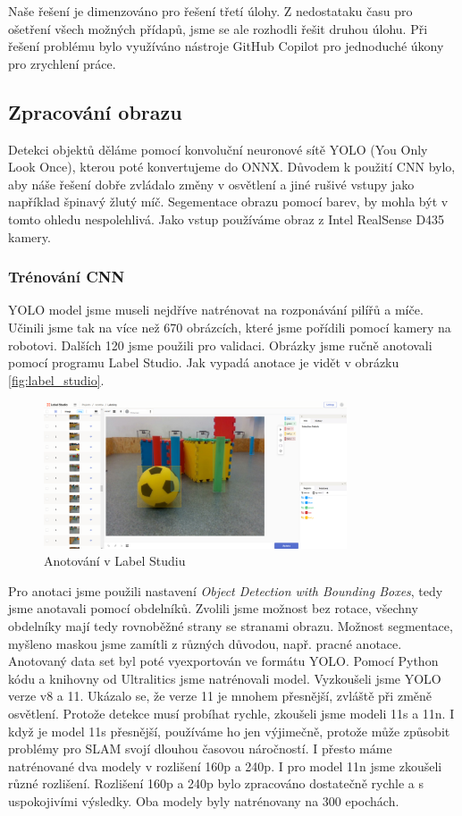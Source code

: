 \documentclass[a4paper,12pt]{article}
\begin{document}
Naše řešení je dimenzováno pro řešení třetí úlohy. Z nedostataku času pro ošetření všech možných přídapů, jsme se ale rozhodli řešit druhou úlohu. 
Při řešení problému bylo využíváno nástroje GitHub Copilot pro jednoduché úkony pro zrychlení práce. 
\subsection{Zpracování obrazu}
Detekci objektů děláme pomocí konvoluční neuronové sítě YOLO (You Only Look Once), kterou poté konvertujeme do ONNX. Důvodem k použití CNN bylo, aby náše řešení dobře zvládalo změny v osvětlení a jiné rušivé vstupy jako například špinavý žlutý míč. Segementace obrazu pomocí barev, by mohla být v tomto ohledu nespolehlivá. Jako vstup používáme obraz z Intel RealSense D435 kamery.
\subsubsection{Trénování CNN}
YOLO model jsme museli nejdříve natrénovat na rozponávání pilířů a míče. Učinili jsme tak na více než 670 obrázcích,
které jsme pořídili pomocí kamery na robotovi. Dalších 120 jsme použili pro validaci. Obrázky jsme ručně anotovali pomocí programu Label Studio. Jak vypadá anotace je vidět v obrázku \eqref{fig:label_studio}.
\begin{figure}[H]
    \centering
    \includegraphics[width=0.8\textwidth]{pictures/label_studio.png}
    \caption{Anotování v Label Studiu}
    \label{fig:label_studio}	
\end{figure}
Pro anotaci jsme použili nastavení \textit{Object Detection with Bounding Boxes}, tedy jsme anotavali pomocí obdelníků. Zvolili jsme možnost bez rotace, všechny obdelníky mají tedy rovnoběžné strany se stranami obrazu. 
Možnost segmentace, myšleno maskou jsme zamítli z různých důvodou, např. pracné anotace. 
Anotovaný data set byl poté vyexportován ve formátu YOLO.
Pomocí Python kódu a knihovny od Ultralitics jsme natrénovali model. Vyzkoušeli jsme YOLO verze v8 a 11. Ukázalo se, že verze 11 je mnohem přesnější, zvláště při změně osvětlení. 
Protože detekce musí probíhat rychle, zkoušeli jsme modeli 11s a 11n. I když je model 11s přesnější, používáme ho jen výjimečně, protože může způsobit problémy pro SLAM svojí dlouhou časovou náročností. I přesto máme natrénované dva modely v rozlišení 160p a 240p.
I pro model 11n jsme zkoušeli různé rozlišení. Rozlišení 160p a 240p bylo zpracováno dostatečně rychle a s uspokojivími výsledky. Oba modely byly natrénovany na 300 epochách.
\end{document}
